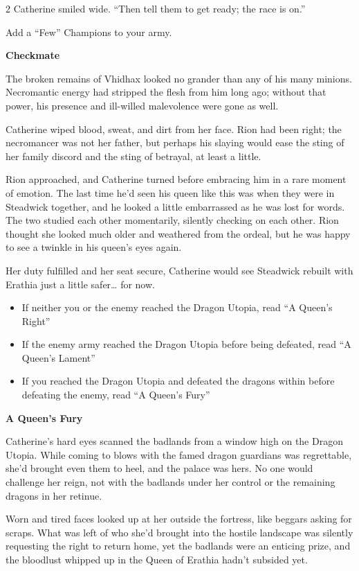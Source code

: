 \begin{multicols*}{2}
Catherine smiled wide.
``Then tell them to get ready; the race is on.''

\textcolor{darkcandyapplered}{Add a ``Few'' Champions to your army.}

\textbf{Checkmate}

The broken remains of Vhidhax looked no grander than any of his many minions.
Necromantic energy had stripped the flesh from him long ago; without that power, his presence and ill-willed malevolence were gone as well.

Catherine wiped blood, sweat, and dirt from her face.
Rion had been right; the necromancer was not her father, but perhaps his slaying would ease the sting of her family discord and the sting of betrayal, at least a little.

Rion approached, and Catherine turned before embracing him in a rare moment of emotion.
The last time he'd seen his queen like this was when they were in Steadwick together, and he looked a little embarrassed as he was lost for words.
The two studied each other momentarily, silently checking on each other.
Rion thought she looked much older and weathered from the ordeal, but he was happy to see a twinkle in his queen's eyes again.

Her duty fulfilled and her seat secure, Catherine would see Steadwick rebuilt with Erathia just a little safer… for now.

\begin{itemize}
    \item \textcolor{darkcandyapplered}{If neither you or the enemy reached the Dragon Utopia, read ``A Queen's Right''}
    \item \textcolor{darkcandyapplered}{If the enemy army reached the Dragon Utopia before being defeated, read ``A Queen's Lament''}
    \item \textcolor{darkcandyapplered}{If you reached the Dragon Utopia and defeated the dragons within before defeating the enemy, read ``A Queen's Fury''}
\end{itemize}

\textbf{A Queen's Fury}

Catherine's hard eyes scanned the badlands from a window high on the Dragon Utopia.
While coming to blows with the famed dragon guardians was regrettable, she'd brought even them to heel, and the palace was hers.
No one would challenge her reign, not with the badlands under her control or the remaining dragons in her retinue.

Worn and tired faces looked up at her outside the fortress, like beggars asking for scraps.
What was left of who she'd brought into the hostile landscape was silently requesting the right to return home, yet the badlands were an enticing prize, and the bloodlust whipped up in the Queen of Erathia hadn't subsided yet.


\end{multicols*}
